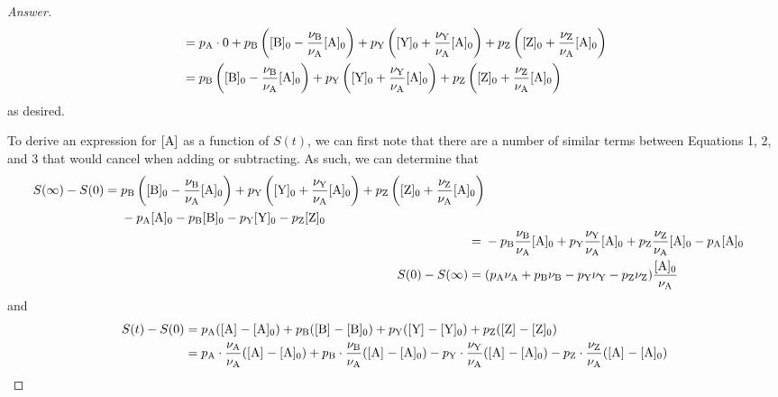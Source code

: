 \documentclass[../psets.tex]{subfiles}
\begin{document}
\begin{enumerate}[label={\textbf{28-\arabic*.}},leftmargin=3.5em]
\begin{proof}[Answer]
\begin{align*}
            &= p_{\ce{A}}\cdot 0+p_{\ce{B}}\left( \cnc[0]{B}-\frac{\nu_{\ce{B}}}{\nu_{\ce{A}}}\cnc[0]{A} \right)+p_{\ce{Y}}\left( \cnc[0]{Y}+\frac{\nu_{\ce{Y}}}{\nu_{\ce{A}}}\cnc[0]{A} \right)+p_{\ce{Z}}\left( \cnc[0]{Z}+\frac{\nu_{\ce{Z}}}{\nu_{\ce{A}}}\cnc[0]{A} \right)\\
            &= p_{\ce{B}}\left( \cnc[0]{B}-\frac{\nu_{\ce{B}}}{\nu_{\ce{A}}}\cnc[0]{A} \right)+p_{\ce{Y}}\left( \cnc[0]{Y}+\frac{\nu_{\ce{Y}}}{\nu_{\ce{A}}}\cnc[0]{A} \right)+p_{\ce{Z}}\left( \cnc[0]{Z}+\frac{\nu_{\ce{Z}}}{\nu_{\ce{A}}}\cnc[0]{A} \right)
        \end{align*}
        as desired.\par
        To derive an expression for $\cnc{A}$ as a function of $S(t)$, we can first note that there are a number of similar terms between Equations 1, 2, and 3 that would cancel when adding or subtracting. As such, we can determine that
        \begin{align*}
            \begin{split}
                S(\infty)-S(0) ={}& p_{\ce{B}}\left( \cnc[0]{B}-\frac{\nu_{\ce{B}}}{\nu_{\ce{A}}}\cnc[0]{A} \right)+p_{\ce{Y}}\left( \cnc[0]{Y}+\frac{\nu_{\ce{Y}}}{\nu_{\ce{A}}}\cnc[0]{A} \right)+p_{\ce{Z}}\left( \cnc[0]{Z}+\frac{\nu_{\ce{Z}}}{\nu_{\ce{A}}}\cnc[0]{A} \right)\\
                &-p_{\ce{A}}\cnc[0]{A}-p_{\ce{B}}\cnc[0]{B}-p_{\ce{Y}}\cnc[0]{Y}-p_{\ce{Z}}\cnc[0]{Z}
            \end{split}\\
            ={}& -p_{\ce{B}}\frac{\nu_{\ce{B}}}{\nu_{\ce{A}}}\cnc[0]{A}+p_{\ce{Y}}\frac{\nu_{\ce{Y}}}{\nu_{\ce{A}}}\cnc[0]{A}+p_{\ce{Z}}\frac{\nu_{\ce{Z}}}{\nu_{\ce{A}}}\cnc[0]{A}-p_{\ce{A}}\cnc[0]{A}\\
            S(0)-S(\infty) ={}& (p_{\ce{A}}\nu_{\ce{A}}+p_{\ce{B}}\nu_{\ce{B}}-p_{\ce{Y}}\nu_{\ce{Y}}-p_{\ce{Z}}\nu_{\ce{Z}})\frac{\cnc[0]{A}}{\nu_{\ce{A}}}
        \end{align*}
        and
        \begin{align*}
            S(t)-S(0) &= p_{\ce{A}}(\cnc{A}-\cnc[0]{A})+p_{\ce{B}}(\cnc{B}-\cnc[0]{B})+p_{\ce{Y}}(\cnc{Y}-\cnc[0]{Y})+p_{\ce{Z}}(\cnc{Z}-\cnc[0]{Z})\\
            &= p_{\ce{A}}\cdot\frac{\nu_{\ce{A}}}{\nu_{\ce{A}}}(\cnc{A}-\cnc[0]{A})+p_{\ce{B}}\cdot\frac{\nu_{\ce{B}}}{\nu_{\ce{A}}}(\cnc{A}-\cnc[0]{A})-p_{\ce{Y}}\cdot\frac{\nu_{\ce{Y}}}{\nu_{\ce{A}}}(\cnc{A}-\cnc[0]{A})-p_{\ce{Z}}\cdot\frac{\nu_{\ce{Z}}}{\nu_{\ce{A}}}(\cnc{A}-\cnc[0]{A})\\

\end{align*}
\end{proof}
\end{enumerate}
\end{document}
